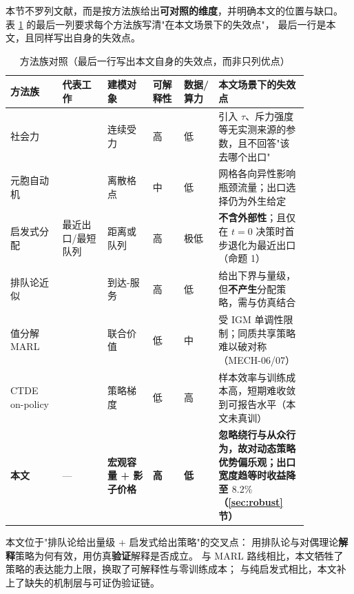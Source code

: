本节不罗列文献，而是按方法族给出\textbf{可对照的维度}，并明确本文的位置与缺口。
表 \ref{tab:related} 的最后一列要求每个方法族写清"在本文场景下的失效点"，
最后一行是本文，且同样写出自身的失效点。

\begin{table}[H]
  \centering
  \caption{方法族对照（最后一行写出本文自身的失效点，而非只列优点）}
  \label{tab:related}
  \small
  \begin{tabular}{p{0.15\linewidth}p{0.13\linewidth}p{0.13\linewidth}p{0.09\linewidth}p{0.10\linewidth}p{0.26\linewidth}}
    \toprule
    方法族 & 代表工作 & 建模对象 & 可解释性 & 数据/算力 & 本文场景下的失效点 \\
    \midrule
    社会力 & \cite{helbing1995socialforce} & 连续受力 & 高 & 低 &
      引入 $\tau$、斥力强度等无实测来源的参数，且不回答"该去哪个出口" \\
    元胞自动机 & \cite{burstedde2001ca,kirchner2002friction} & 离散格点 & 中 & 低 &
      网格各向异性影响瓶颈流量；出口选择仍为外生给定 \\
    启发式分配 & 最近出口/最短队列 & 距离或队列 & 高 & 极低 &
      \textbf{不含外部性}；且仅在 $t=0$ 决策时首步退化为最近出口（命题 1） \\
    排队论近似 & \cite{little1961,law2015} & 到达-服务 & 高 & 低 &
      给出下界与量级，但\textbf{不产生}分配策略，需与仿真结合 \\
    值分解 MARL & \cite{sunehag2018vdn,rashid2018qmix} & 联合价值 & 低 & 中 &
      受 IGM 单调性限制；同质共享策略难以破对称（MECH-06/07） \\
    CTDE on-policy & \cite{yu2022mappo,foerster2018coma} & 策略梯度 & 低 & 高 &
      样本效率与训练成本高，短期难收敛到可报告水平（本文未真训） \\
    \midrule
    \textbf{本文} & --- & \textbf{宏观容量 + 影子价格} & \textbf{高} & \textbf{低} &
      \textbf{忽略绕行与从众行为，故对动态策略优势偏乐观；出口宽度趋等时收益降至 $8.2\%$（\ref{sec:robust} 节）} \\
    \bottomrule
  \end{tabular}
\end{table}

\begin{csftake}[相关工作表的结论]
本文位于"排队论给出量级 + 启发式给出策略"的交叉点：
用排队论与对偶理论\textbf{解释}策略为何有效，用仿真\textbf{验证}解释是否成立。
与 MARL 路线相比，本文牺牲了策略的表达能力上限，换取了可解释性与零训练成本；
与纯启发式相比，本文补上了缺失的机制层与可证伪验证链。
\end{csftake}

